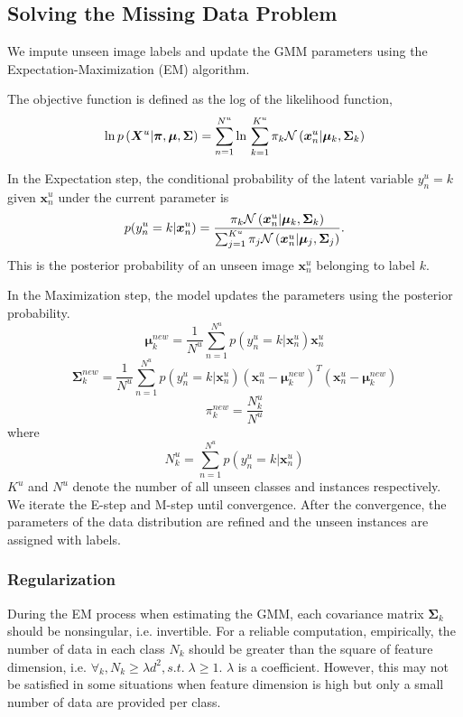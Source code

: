 \documentclass{article}
\begin{document}
\subsection{Solving the Missing Data Problem}
We impute unseen image labels and update the GMM parameters using the Expectation-Maximization (EM) algorithm.

The objective function is defined as the log of the likelihood function,
\begin{equation}
\ln{p\left( {{\bm{X}^u}|{\bm{\pi}, \bm{\mu}},\bm{\Sigma} } \right)} = \sum_{n=1}^{N^u}{\ln{}} \sum\limits_{k = 1}^{K^u} {{\pi _k}{\cal N}\left( {{\bm{x}^u_n}|{\bm{\mu}_k},{\bm{\Sigma} _k}} \right)}
\end{equation}

In the Expectation step, the conditional probability of the latent variable $y^u_n=k$ given $\bm{x}^u_n$ under the current parameter is
\begin{equation}
p(y^u_n=k | \bm{x}^u_n) = \frac{{\pi _k}{\cal N}\left( {{\bm{x}^u_n}|{\bm{\mu}_k},{\bm{\Sigma} _k}} \right)}{\sum_{j=1}^{K^u}{{\pi _j}{\cal N}\left( {{\bm{x}^u_n}|{\bm{\mu}_j},{\bm{\Sigma} _j}} \right)}}.
\end{equation}
This is the posterior probability of an unseen image $\bm{x}^u_n$ belonging to label $k$.

In the Maximization step, the model updates the parameters using the posterior probability.
\begin{equation}
\bm{\mu}_k^{new} = \frac{1}{N^u} \sum_{n=1}^{N^u}{p(y^u_n=k | \bm{x}^u_n) \bm{x}^u_n}
\end{equation}
\begin{equation}
\bm{\Sigma}_k^{new} = \frac{1}{N^u} \sum_{n=1}^{N^u}{p(y^u_n=k | \bm{x}^u_n) (\bm{x}^u_n-\bm{\mu}_k^{new})^T(\bm{x}^u_n-\bm{\mu}_k^{new})}
\end{equation}
\begin{equation}
\pi^{new}_k = \frac{N^u_k}{N^u}
\end{equation}
where
\begin{equation}
N^u_k = \sum_{n=1}^{N^u}{p(y^u_n=k | \bm{x}^u_n)}
\end{equation}
$K^u$ and $N^u$ denote the number of all unseen classes and instances respectively. We iterate the E-step and M-step until convergence. After the convergence, the parameters of the data distribution are refined and the unseen instances are assigned with labels.




\subsubsection{Regularization}
\label{sec:analysisOptimization}
During the EM process when estimating the GMM, each covariance matrix $\bm{\Sigma}_k$ should be nonsingular, i.e. invertible. For a reliable computation, empirically, the number of data in each class $N_k$ should be greater than the square of feature dimension, i.e. $\forall_k, N_k \geq \lambda d^2, s.t. \; \lambda \geq 1 $. $\lambda$ is a coefficient. However, this may not be satisfied in some situations when feature dimension is high but only a small number of data are provided per class.
\end{document}
